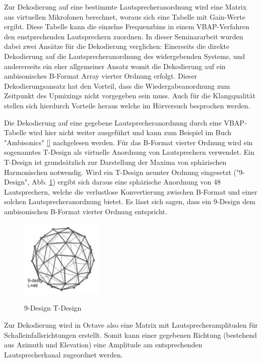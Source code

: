 Zur Dekodierung auf eine bestimmte Lautsprecheranordnung wird eine Matrix aus virtuellen Mikrofonen berechnet, woraus sich eine Tabelle mit Gain-Werte ergibt. Diese Tabelle kann die einzelne Frequenzbins in einem VBAP-Verfahren den enstprechenden Lautsprechern zuordnen. In dieser Seminararbeit wurden dabei zwei Ansätze für die Dekodierung verglichen: Einerseits die direkte Dekodierung auf die Lautsprecheranordnung des widergebenden Systems, und andererseits ein eher allgemeiner Ansatz womit die Dekodierung auf ein ambisonisches B-Format Array vierter Ordnung erfolgt. Dieser Dekodierungsansatz hat den Vorteil, dass die Wiedergabeanordnung zum Zeitpunkt des Upmixings nicht vorgegeben sein muss. Auch für die Klangqualität stellen sich hierdurch Vorteile heraus welche im Hörversuch besprochen werden.

Die Dekodierung auf eine gegebene Lautsprecheranordnung durch eine VBAP-Tabelle wird hier nicht weiter ausgeführt und kann zum Beispiel im Buch "Ambisonics" \ref{} nachgelesen werden. Für das B-Format vierter Ordnung wird ein sogenanntes T-Design als virtuelle Anordnung von Lautsprechern verwendet. Ein T-Design ist grundsätzlich zur Darstellung der Maxima von sphärischen Harmonischen notwendig. Wird ein T-Design neunter Ordnung eingesetzt ("9-Design", Abb. \ref{fig:tdesign}) ergibt sich daraus eine sphärische Anordnung von 48 Lautsprechern, welche die verlustlose Konvertierung zwischen B-Format und einer solchen Lautsprecheranordnung bietet. Es lässt sich sagen, dass ein 9-Design dem ambisonischen B-Format vierter Ordnung entspricht.

\begin{figure}[!ht]
  \centering
  \includegraphics[width=0.35\textwidth]{implementierung/plots/t-design.png}
  \label{fig:tdesign}
  \caption{9-Design T-Design}
\end{figure}

Zur Dekodierung wird in Octave also eine Matrix mit Lautsprecheramplituden für Schalleinfallsrichtungen erstellt. Somit kann einer gegebenen Richtung (bestehend aus Azimuth und Elevation) eine Amplitude am entsprechenden Lautsprecherkanal zugeordnet werden.
